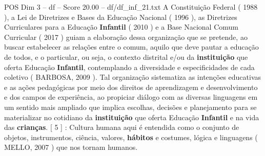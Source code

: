 \begin{textsample}{POS Dim 3 – df – Score 20.00 – df/df\_inf\_21.txt}
A Constituição Federal ( 1988 ), a Lei de Diretrizes e Bases da Educação Nacional ( 1996 ), as Diretrizes Curriculares para a Educação \textbf{Infantil} ( 2010 ) e a Base Nacional Comum Curricular ( 2017 ) guiam a elaboração dessa organização que se pretende, ao buscar estabelecer as relações entre o comum, aquilo que deve pautar a educação de todos, e o particular, ou seja, o contexto distrital e/ou da \textbf{instituição} que oferta Educação \textbf{Infantil}, contemplando a diversidade e especificidades de cada coletivo ( BARBOSA, 2009 ).
Tal organização sistematiza as intenções educativas e as ações pedagógicas por meio dos direitos de aprendizagem e desenvolvimento e dos campos de experiência, ao propiciar diálogo com as diversas linguagens em um sentido mais ampliado que implica escolhas, decisões e planejamento para se materializar no cotidiano da \textbf{instituição} que oferta Educação \textbf{Infantil} e na vida das \textbf{crianças}. [ 5 ] : Cultura humana aqui é entendida como o conjunto de objetos, instrumentos, ciência, valores, \textbf{hábitos} e costumes, lógica e linguagens ( MELLO, 2007 ) que nos tornam humanos.

\end{textsample}
